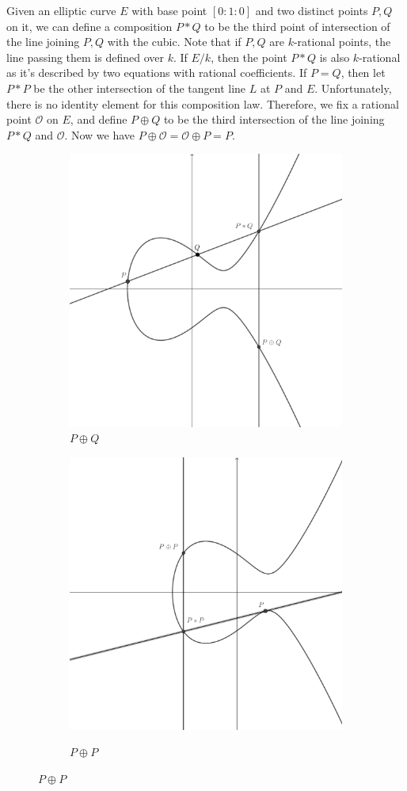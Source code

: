\documentclass[12pt]{article}
\theoremstyle{remark}
\theoremstyle{definition}
\begin{document}
        Given an elliptic curve $E$ with base point $[0:1:0]$ and two distinct points $P, Q$ on it, we can define a composition $P*Q$ to be the third point of intersection of the line joining $P, Q$ with the cubic. Note that if $P, Q$ are $k$-rational points, the line passing them is defined over $k$. If $E/k$, then the point $P* Q$ is also $k$-rational as it's described by two equations with rational coefficients. If $P = Q$, then let $P* P$ be the other intersection of the tangent line $L$ at $P$ and $E$. Unfortunately, there is no identity element for this composition law. Therefore, we fix a rational point $\mathcal{O}$ on $E$, and define $P \oplus Q$ to be the third intersection of the line joining $P * Q$ and $\mathcal{O}$. Now we have $P \oplus \mathcal{O} = \mathcal{O} \oplus P = P$.
        \begin{figure}[h]
        \centering
        \begin{subfigure}{.5\textwidth}
        \centering
        \includegraphics[width=.7\linewidth]{figures/1.png}
        \caption{$P\oplus Q$}
        \end{subfigure}%
        \begin{subfigure}{.5\textwidth}
        \centering
        \includegraphics[width=.7\linewidth]{figures/2.png}
        \label{fig:sub2}
        \caption{$P\oplus P$}
        \end{subfigure}
        \end{figure}
        
\end{document}
